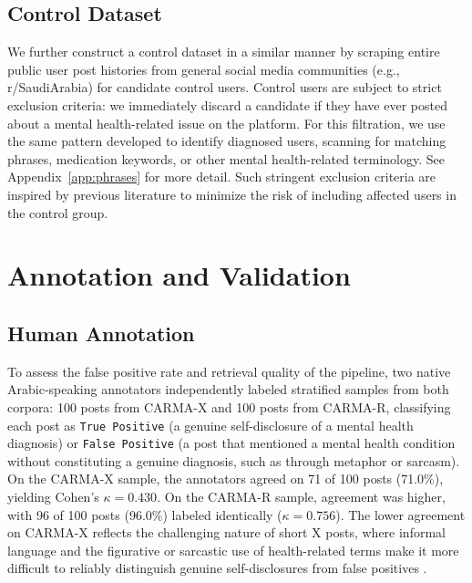 \documentclass[11pt]{article}
\begin{document}
\subsection{Control Dataset}

We further construct a control dataset in a similar manner by scraping entire public user post histories from general social media communities (e.g., r/SaudiArabia) for candidate control users. Control users are subject to strict exclusion criteria: we immediately discard a candidate if they have ever posted about a mental health-related issue on the platform. For this filtration, we use the same pattern developed to identify diagnosed users, scanning for matching phrases, medication keywords, or other mental health-related terminology. See Appendix~\ref{app:phrases} for more detail. Such stringent exclusion criteria are inspired by previous literature \cite{cohan-etal-2018-smhd} to minimize the risk of including affected users in the control group.






\section{Annotation and Validation}
\label{sec:annotation}

\subsection{Human Annotation}
\label{subsec:human_annotation}

To assess the false positive rate and retrieval quality of the pipeline,
two native Arabic-speaking annotators independently labeled stratified
samples from both corpora: 100 posts from CARMA-X and 100 posts from
CARMA-R, classifying each post as \texttt{True Positive} (a genuine
self-disclosure of a mental health diagnosis) or \texttt{False Positive}
(a post that mentioned a mental health condition without constituting a
genuine diagnosis, such as through metaphor or sarcasm). On the CARMA-X
sample, the annotators agreed on 71 of 100 posts (71.0\%), yielding
Cohen's $\kappa = 0.430$. On the CARMA-R sample, agreement was higher,
with 96 of 100 posts (96.0\%) labeled identically ($\kappa = 0.756$).
The lower agreement on CARMA-X reflects the challenging nature of short
X posts, where informal language and the figurative or sarcastic use of
health-related terms make it more difficult to reliably distinguish
genuine self-disclosures from false positives
\cite{naseem2022robust, naseem2022identification}.
\end{document}
